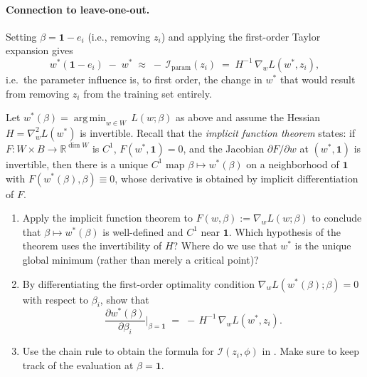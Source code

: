 \documentclass[11pt]{article}
\DeclareMathOperator*{\argmin}{arg\,min}
\begin{document}
\paragraph{Connection to leave-one-out.} Setting $\beta = \mathbf{1} - e_i$ (i.e., removing $z_i$) and applying the first-order Taylor expansion gives
\begin{equation}
  w^*(\mathbf{1} - e_i) \;-\; w^* \;\approx\; -\,\mathcal{I}_{\mathrm{param}}(z_i) \;=\; H^{-1}\,\nabla_w L(w^*,z_i),
  \label{eq:loo-approx}
\end{equation}
i.e.\ the parameter influence is, to first order, the change in $w^*$ that would result from removing $z_i$ from the training set entirely. 

\begin{exercise}\label{ex:if-derive}
Let $w^*(\beta) = \argmin_{w\in W}\,L(w;\beta)$ as above and assume the Hessian $H = \nabla_w^2 L(w^*)$ is invertible. Recall that the \emph{implicit function theorem} states: if $F:W\times B\to\mathbb{R}^{\dim W}$ is $C^1$, $F(w^*,\mathbf{1})=0$, and the Jacobian $\partial F/\partial w$ at $(w^*,\mathbf{1})$ is invertible, then there is a unique $C^1$ map $\beta\mapsto w^*(\beta)$ on a neighborhood of $\mathbf{1}$ with $F(w^*(\beta),\beta)\equiv 0$, whose derivative is obtained by implicit differentiation of $F$.
\begin{enumerate}
  \item[(a)] Apply the implicit function theorem to $F(w,\beta) := \nabla_w L(w;\beta)$ to conclude that $\beta\mapsto w^*(\beta)$ is well-defined and $C^1$ near $\mathbf{1}$. Which hypothesis of the theorem uses the invertibility of $H$? Where do we use that $w^*$ is the unique global minimum (rather than merely a critical point)?
  \item[(b)] By differentiating the first-order optimality condition $\nabla_w L(w^*(\beta);\beta)=0$ with respect to $\beta_i$, show that
  \[
    \frac{\partial w^*(\beta)}{\partial \beta_i}\bigg\rvert_{\beta=\mathbf{1}} \;=\; -\,H^{-1}\,\nabla_w L(w^*,z_i).
  \]
  \item[(c)] Use the chain rule to obtain the formula for $\mathcal{I}(z_i,\phi)$ in . Make sure to keep track of the evaluation at $\beta = \mathbf{1}$.
\end{enumerate}
\end{exercise}
\end{document}
